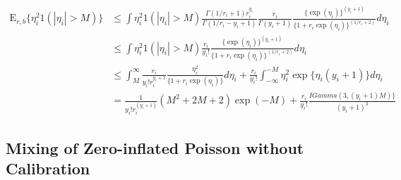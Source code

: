 \documentclass[10pt]{article}
\begin{document}
\begin{equation}
	\begin{aligned}
			\mbox{E}_{r,b}\{ \eta_{i}^2 1(|\eta_{i}|>M) \}  %
	&	 \le      \int      \eta_i^2  1(|\eta_{i}|>M)  \frac{\Gamma(1/r_i+1)r_i^{y_i}}{\Gamma(1/r_i-y_i+1)}\frac{r_i}{\Gamma(y_i+1)}\frac{\{\exp(\eta_{i})\}^{(y_i+1)}}{\{1+r_i\exp(\eta_{i})\}^{(1/r_i+2)}} d\eta_i  \\
	&  \le \int \eta_i^2  1(|\eta_{i}|>M) \frac{r_i}{y_i!}\frac{\{\exp(\eta_{i})\}^{(y_i+1)}}{\{1+r_i\exp(\eta_{i})\}^{(1/r_i+2)}} d\eta_i  \\	
		& \le \int_M^{\infty} \frac{r_i}{y_i! r_i^{y_i+1}}\frac{\eta_i^2}{\{1+r_i\exp(\eta_{i})\}} d\eta_i 
				+  \frac{r_i}{y_i!} \int_{-\infty}^{-M}{\eta_{i}^2}{\exp\{\eta_{i} (y_i+1) \}}d\eta_{i} \\
	& =  \frac{1}{y_i! r_i^{(y_i+1)}}   (M^2+2M+2)\exp(-M) + \frac{r_i}{y_i!}    \frac{IGamma(3, (y_i+1)M)\} }{(y_i+1)^3 }
	\end{aligned}
\end{equation}



\subsection{Mixing of Zero-inflated Poisson without Calibration}
\end{document}

